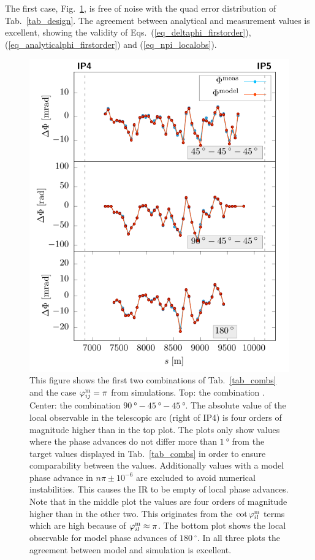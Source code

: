 The first case, Fig.~\ref{fig_design_nonoise}, is free of noise with the quad error distribution of
Tab.~\ref{tab_design}.
The agreement between analytical and measurement values is excellent, showing the validity of
Eqs.~(\ref{eq_deltaphi_firstorder}), (\ref{eq_analyticalphi_firstorder}) and (\ref{eq_npi_localobs}).

\newcommand{\errdist}{design}

\begin{figure}
  \centering
  \includegraphics[width=.5\linewidth]{sim_no_noise}
  \caption{
    This figure shows the first two combinations of Tab.~\ref{tab_combs} and the case $\varphi_{ij}^\text{m} = \pi$
    from simulations.
    Top: the combination .
    Center: the combination $\SI{90}{\degree}-\SI{45}{\degree}-\SI{45}{\degree}$. The absolute value of the local observable in the telescopic arc
    (right of IP4) is four orders of magnitude higher than in the top plot.
    The plots only show values where the phase advances do not differ more than $\SI{1}{\degree}$
    from the target values displayed in Tab.~\ref{tab_combs} in order to ensure comparability between
    the values. Additionally values with a model phase advance in $n\pi \pm 10^{-6}$ are excluded
    to avoid numerical instabilities.
    This causes the IR to be empty of local phase advances. 
    Note that in the middle plot the values are four orders of magnitude higher than in the other two.
    This originates from the $\cot\varphi_{il}^\text{m}$ terms which are high because of $\varphi_{il}^\text{m} \approx \pi$.%
    The bottom plot shows the local observable for model phase advances of $\SI{180}{^\circ}$. 
    In all three plots the agreement between model and simulation is excellent.
  }
  \label{fig_design_nonoise}
\end{figure}

